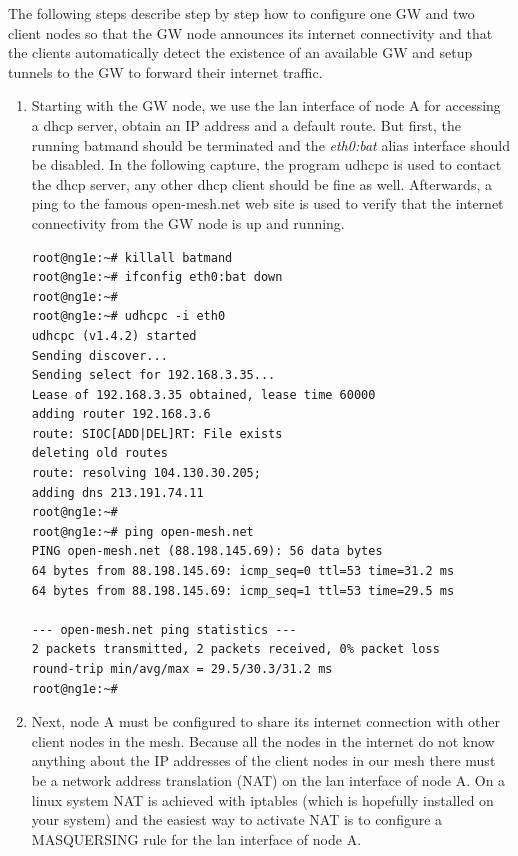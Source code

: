 \documentclass[11pt]{article}
\begin{document}
The following steps describe step by step how to configure one GW and two client nodes so that the GW node announces its internet connectivity and that the clients automatically detect the existence of an available GW and setup tunnels to the GW to forward their internet traffic.

\begin{enumerate}

\item Starting with the GW node, we use the lan interface of node A for accessing a dhcp server, obtain an IP address and a default route.
But first, the running batmand should be terminated and the \emph{eth0:bat} alias interface should be disabled.
In the following capture, the program udhcpc is used to contact the dhcp server, any other dhcp client should be fine as well.
Afterwards, a ping to the famous open-mesh.net web site is used to verify that the internet connectivity from the GW node is up and running.

\begin{small} \begin{verbatim}
root@ng1e:~# killall batmand
root@ng1e:~# ifconfig eth0:bat down
root@ng1e:~#
root@ng1e:~# udhcpc -i eth0
udhcpc (v1.4.2) started
Sending discover...
Sending select for 192.168.3.35...
Lease of 192.168.3.35 obtained, lease time 60000
adding router 192.168.3.6
route: SIOC[ADD|DEL]RT: File exists
deleting old routes
route: resolving 104.130.30.205;
adding dns 213.191.74.11
root@ng1e:~# 
root@ng1e:~# ping open-mesh.net
PING open-mesh.net (88.198.145.69): 56 data bytes
64 bytes from 88.198.145.69: icmp_seq=0 ttl=53 time=31.2 ms
64 bytes from 88.198.145.69: icmp_seq=1 ttl=53 time=29.5 ms

--- open-mesh.net ping statistics ---
2 packets transmitted, 2 packets received, 0% packet loss
round-trip min/avg/max = 29.5/30.3/31.2 ms
root@ng1e:~#
\end{verbatim} \end{small}

\item Next, node A must be configured to share its internet connection with other client nodes in the mesh. 
Because all the nodes in the internet do not know anything about the IP addresses of the client nodes in our mesh there must be a network address translation (NAT) on the lan interface of node A. 
On a linux system NAT is achieved with iptables (which is hopefully installed on your system) and the easiest way to activate NAT is to configure a MASQUERSING rule for the lan interface of node A.


\end{enumerate}
\end{document}
